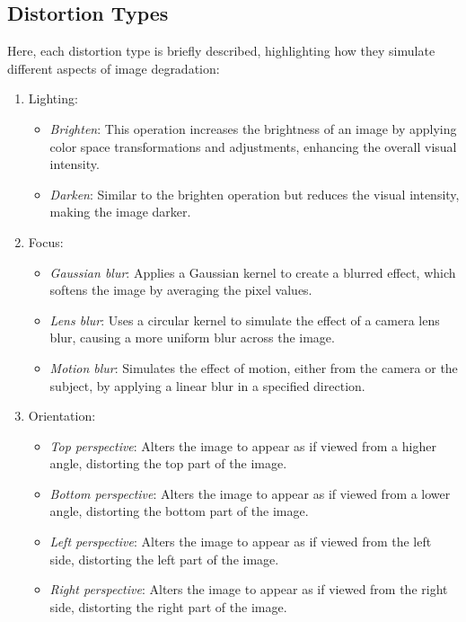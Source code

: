 \subsection{Distortion Types}
\label{sub:DistTypes}
Here, each distortion type is briefly described, highlighting how they simulate different aspects of image degradation: \par
\begin{enumerate}
    \item Lighting:
        \begin{itemize}
            \item \textit{Brighten}: This operation increases the brightness of an image by applying color space transformations and adjustments, enhancing the overall visual intensity.
            \item \textit{Darken}: Similar to the brighten operation but reduces the visual intensity, making the image darker.
        \end{itemize}
    \item Focus:
        \begin{itemize}
            \item \textit{Gaussian blur}: Applies a Gaussian kernel to create a blurred effect, which softens the image by averaging the pixel values.
            \item \textit{Lens blur}: Uses a circular kernel to simulate the effect of a camera lens blur, causing a more uniform blur across the image.
            \item \textit{Motion blur}: Simulates the effect of motion, either from the camera or the subject, by applying a linear blur in a specified direction.
        \end{itemize}
    \item Orientation:
        \begin{itemize}
            \item \textit{Top perspective}: Alters the image to appear as if viewed from a higher angle, distorting the top part of the image.
            \item \textit{Bottom perspective}: Alters the image to appear as if viewed from a lower angle, distorting the bottom part of the image.
            \item \textit{Left perspective}: Alters the image to appear as if viewed from the left side, distorting the left part of the image.
            \item \textit{Right perspective}: Alters the image to appear as if viewed from the right side, distorting the right part of the image.

\end{itemize}
\end{enumerate}
